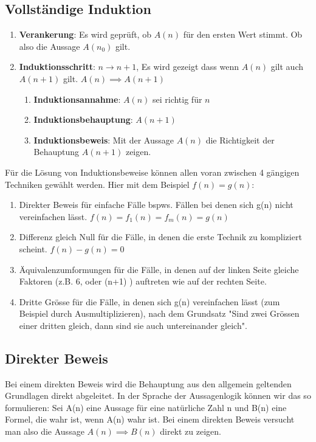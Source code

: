 \subsection{Vollständige Induktion}
\begin{enumerate}
    \item \textbf{Verankerung}: Es wird geprüft, ob \(A(n)\) für den ersten Wert stimmt.
    Ob also die Aussage \( A(n_0) \) gilt.
    \item \textbf{Induktionsschritt}: \(n \rightarrow n+1 \), Es wird gezeigt dass wenn \(A(n)\) gilt auch \(A(n+1)\) gilt. \( A(n) \implies A(n+1)\)
    \begin{enumerate}
        \item \textbf{Induktionsannahme}: \(A(n)\) sei richtig für \(n\)
        \item \textbf{Induktionsbehauptung}: \(A(n+1)\)
        \item \textbf{Induktionsbeweis}: Mit der Aussage \(A(n)\) die Richtigkeit der Behauptung \(A(n+1)\) zeigen.
    \end{enumerate}
\end{enumerate}
Für die Lösung von Induktionsbeweise können allen voran zwischen 4 gängigen Techniken gewählt werden.
Hier mit dem Beispiel \(f(n)=g(n)\):
\begin{enumerate}
    \item Direkter Beweis für einfache Fälle bspws. Fällen bei denen sich g(n) nicht vereinfachen lässt.
    \(f(n)=f_1(n)=f_m(n)=g(n)\)
    \item Differenz gleich Null für die Fälle, in denen die erste Technik zu kompliziert 
    scheint. \(f(n)-g(n)=0\)
    \item Äquivalenzumformungen für die Fälle, in denen auf der linken Seite 
    gleiche Faktoren (z.B. 6, oder (n+1) ) auftreten wie auf der rechten Seite.
    \item Dritte Grösse für die Fälle, in denen sich g(n) vereinfachen lässt (zum 
    Beispiel durch Ausmultiplizieren), nach dem Grundsatz "Sind zwei Grössen einer 
    dritten gleich, dann sind sie auch untereinander gleich".
\end{enumerate}

\subsection{Direkter Beweis}
Bei einem direkten Beweis wird die Behauptung aus den allgemein geltenden Grundlagen 
direkt abgeleitet. In der Sprache der Aussagenlogik können wir das so formulieren: Sei 
A(n) eine Aussage für eine natürliche Zahl n und B(n) eine Formel, die wahr ist, wenn 
A(n) wahr ist. Bei einem direkten Beweis versucht man also die Aussage \( A(n) \implies B(n)\)
direkt zu zeigen. 


